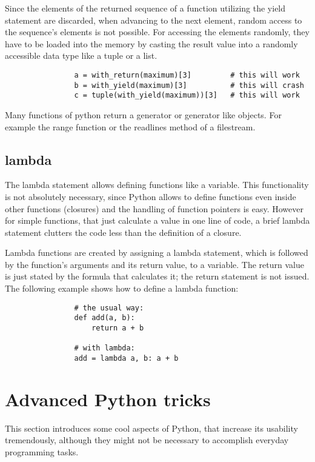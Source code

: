 			Since the elements of the returned sequence of a function utilizing the {\normalfont \ttfamily yield} statement are discarded, when advancing to the next element, random access to the sequence's elements is not possible.
			For accessing the elements randomly, they have to be loaded into the memory by casting the result value into a randomly accessible data type like a tuple or a list.
			\begin{verbatim}
				a = with_return(maximum)[3]         # this will work
				b = with_yield(maximum)[3]          # this will crash
				c = tuple(with_yield(maximum))[3]   # this will work
			\end{verbatim}

			Many functions of python return a generator or generator like objects.
			For example the {\normalfont \ttfamily range} function or the {\normalfont \ttfamily readlines} method of a filestream.

		\subsection{lambda}
			The {\normalfont \ttfamily lambda} statement allows defining functions like a variable.
			This functionality is not absolutely necessary, since Python allows to define functions even inside other functions (closures) and the handling of function pointers is easy.
			However for simple functions, that just calculate a value in one line of code, a brief {\normalfont \ttfamily lambda} statement clutters the code less than the definition of a closure.

			Lambda functions are created by assigning a {\normalfont \ttfamily lambda} statement, which is followed by the function's arguments and its return value, to a variable.
			The return value is just stated by the formula that calculates it; the {\normalfont \ttfamily return} statement is not issued.
			The following example shows how to define a lambda function:
			\begin{verbatim}
				# the usual way:
				def add(a, b):
					return a + b

				# with lambda:
				add = lambda a, b: a + b
			\end{verbatim}


	\section{Advanced Python tricks}
		This section introduces some cool aspects of Python, that increase its usability tremendously, although they might not be necessary to accomplish everyday programming tasks.

